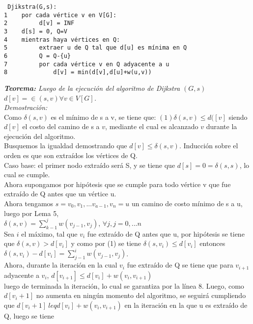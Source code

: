 \documentclass[12pt]{article}
\begin{document}
\begin{verbatim}
 Djikstra(G,s):
1    por cada vértice v en V[G]:
2         d[v] = INF
3    d[s] = 0, Q=V
4    mientras haya vértices en Q:
5         extraer u de Q tal que d[u] es mínima en Q
6         Q = Q-{u}
7         por cada vértice v en Q adyacente a u
8             d[v] = min(d[v],d[u]+w(u,v))
\end{verbatim}

\textit{\textbf{Teorema:} Luego de la ejecuci\'on del algoritmo de Dijkstra $(G,s)$\\
          $d[v] = \in (s,v) \forall v \in V[G]$.}\\

\textit{Demostraci\'on:}\\ 
Como $\delta (s,v)$ es el m\'inimo de s a v, se tiene que: $(1)\delta (s,v) \leq d([v]$ siendo $d[v]$ el costo del camino de s a $v$, mediante el cual
 es alcanzado  $v$ durante la ejecuci\'on del algoritmo.\\
Busquemos la igualdad demostrando que $d[v] \leq \delta(s,v)$. Inducci\'on sobre el orden es que son extra\'idos los v\'ertices de Q.\\
Caso base: el primer nodo extra\'ido ser\'a S, y se tiene que $d[s] = 0 = \delta (s,s)$, lo cual se cumple.\\

Ahora supongamos por hip\'otesis que se cumple para todo v\'ertice v que fue extra\'ido de Q antes que un v\'ertice u.\\ 
Ahora tengamos $s = v_0, v_1, ...v_{a-1}, v_n = u$ un camino de costo m\'inimo de s a u,
luego por Lema 5, \\
$\delta (s,v) = \sum\limits^{j}_{k-1} w(v_{j-1},v_j)$, $ \forall j,j = 0,...n$\\

Sea $i$ el m\'aximo, tal que $v_i$ fue extra\'ido de Q antes que u, por hip\'otesis se tiene que $\delta (s,v) > d[v_i]$ y como por (1) se tiene $\delta (s,v_i) \leq d[v_i]$ entonces \\
$\delta (s,v_i) - d[v_i] = \sum\limits^{i}_{j-1} w(v_{j-1}, v_j)$.\\ 

Ahora, durante la iteraci\'on en la cual $v_i$ fue extra\'ido de Q se tiene que para $v_{i+1}$ adyacente a $v_i$, 
$d[v_{i+1}] \leq	d[v_i] + w(v_i, v_{i+1})$\\
luego de terminada la iteraci\'on, lo cual se garantiza por la l\'inea 8.  Luego, como $d[v_i+1]$ no aumenta en ning\'un momento del algoritmo, se seguir\'a
cumpliendo que $d[v_i+1] \ leq d[v_i] + w(v_i, v_{i+1})$ en la iteraci\'on en la que u es extra\'ido de Q, luego se tiene\\
\end{document}
